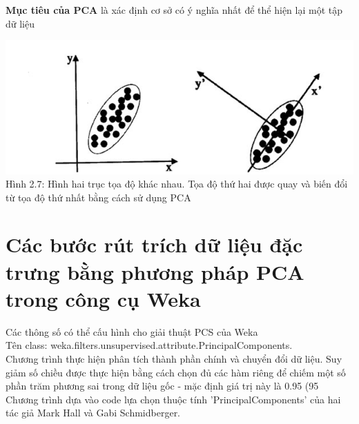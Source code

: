\documentclass{hcmutarticle}
\begin{document}
\textbf{Mục tiêu của PCA } là xác định cơ sở có ý nghĩa nhất để thể hiện lại một tập dữ liệu

\begin{center}
	\includegraphics[scale=0.8]{image/figure.png}\\[0.5cm]
	Hình 2.7: Hình hai trục tọa độ khác nhau. Tọa độ thứ hai được quay và biến đổi từ tọa độ thứ nhất bằng cách sử dụng PCA
\end{center}

\section{Các bước rút trích dữ liệu đặc trưng bằng phương pháp PCA trong công cụ Weka}

Các thông số có thể cấu hình cho giải thuật PCS của Weka \\

Tên class: weka.filters.unsupervised.attribute.PrincipalComponents.\\
Chương trình thực hiện phân tích thành phần chính và chuyển đổi dữ liệu.
Suy giảm số chiều được thực hiện bằng cách chọn đủ các hàm riêng để chiếm một số phần trăm phương sai trong dữ liệu gốc - mặc định giá trị này là 0.95 (95%
Chương trình dựa vào code lựa chọn thuộc tính 'PrincipalComponents' của hai tác giả  Mark Hall và Gabi Schmidberger.
\end{document}
